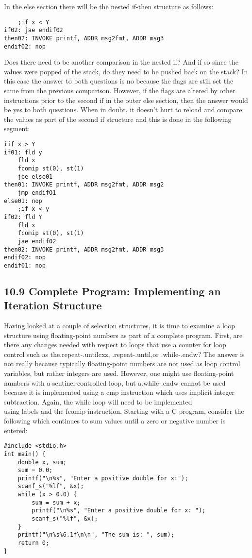 \documentclass[10pt]{article}
\begin{document}
In the else section there will be the nested if-then structure as follows:

\begin{verbatim}
    ;if x < Y
if02: jae endif02
then02: INVOKE printf, ADDR msg2fmt, ADDR msg3
endif02: nop
\end{verbatim}

Does there need to be another comparison in the nested if? And if so since the values were popped of the stack, do they need to be pushed back on the stack? In this case the answer to both questions is no because the flags are still set the same from the previous comparison. However, if the flags are altered by other instructions prior to the second if in the outer else section, then the answer would be yes to both questions. When in doubt, it doesn't hurt to reload and compare the values as part of the second if structure and this is done in the following segment:

\begin{verbatim}
iif x > Y
if01: fld y
    fld x
    fcomip st(0), st(1)
    jbe else01
then01: INVOKE printf, ADDR msg2fmt, ADDR msg2
    jmp endifO1
else01: nop
    ;if x < y
if02: fld Y
    fld x
    fcomip st(0), st(1)
    jae endif02
then02: INVOKE printf, ADDR msg2fmt, ADDR msg3
endif02: nop
endif01: nop
\end{verbatim}

\subsection*{10.9 Complete Program: Implementing an Iteration Structure}
Having looked at a couple of selection structures, it is time to examine a loop structure using floating-point numbers as part of a complete program. First, are there any changes needed with respect to loops that use a counter for loop control such as the.repeat-.untilcxz, .repeat-.until,or .while-.endw? The answer is not really because typically floating-point numbers are not used as loop control variables, but rather integers are used. However, one might use floating-point numbers with a sentinel-controlled loop, but a.while-.endw cannot be used because it is implemented using a cmp instruction which uses implicit integer subtraction. Again, the while loop will need to be implemented\\
using labels and the fcomip instruction. Starting with a C program, consider the following which continues to sum values until a zero or negative number is entered:

\begin{verbatim}
#include <stdio.h>
int main() {
    double x, sum;
    sum = 0.0;
    printf("\n%s", "Enter a positive double for x:");
    scanf_s("%lf", &x);
    while (x > 0.0) {
        sum = sum + x;
        printf("\n%s", "Enter a positive double for x: ");
        scanf_s("%lf", &x);
    }
    printf("\n%s%6.1f\n\n", "The sum is: ", sum);
    return 0;
}
\end{verbatim}
\end{document}
